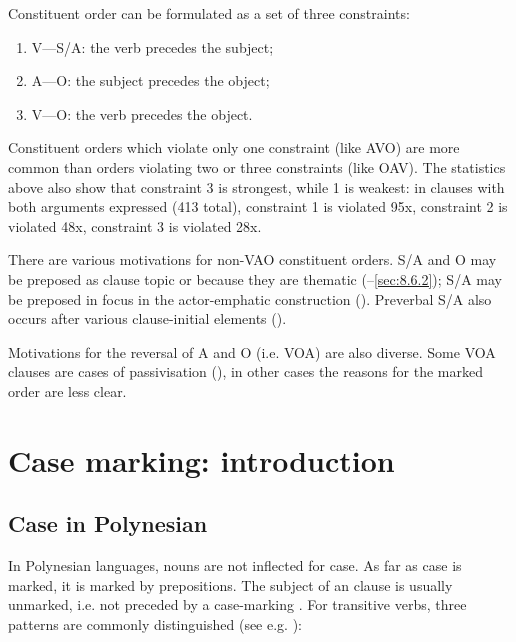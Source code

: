 Constituent order can be formulated as a set of three constraints: 

\begin{enumerate}
\item 
V—S/A: the verb precedes the subject;

\item 
A—O: the subject precedes the object; 

\item 
V—O: the verb precedes the object. 

\end{enumerate}

Constituent orders which violate only one constraint (like AVO) are more common than orders violating two or three constraints (like OAV). The statistics above also show that constraint 3 is strongest, while 1 is weakest: in clauses with both arguments expressed (413 total), constraint 1 is violated 95x, constraint 2 is violated 48x, constraint 3 is violated 28x.

There are various motivations for non-VAO constituent orders. S/A and O may be preposed as clause topic or because they are thematic (–\ref{sec:8.6.2}); S/A may be preposed in focus in the actor-emphatic construction (). Preverbal S/A also occurs after various clause-initial elements ().

Motivations for the reversal of A and O (i.e. VOA) are also diverse. Some VOA clauses are cases of passivisation (), in other cases the reasons for the marked order are less clear. 

\section{Case marking: introduction}\label{sec:8.2}
\subsection{Case in Polynesian}\label{sec:8.2.1}

In Polynesian languages, nouns are not inflected for case. As far as case is marked, it is marked by prepositions. The subject of an  clause is usually unmarked, i.e. not preceded by a case-marking . For transitive verbs, three patterns are commonly distinguished (see e.g. \citealt[67]{Clark1976}):

